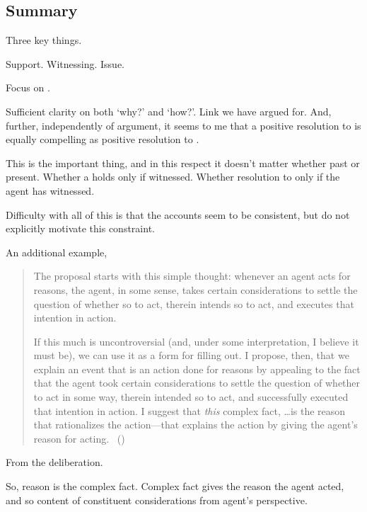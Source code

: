 \subsection{Summary}
\label{cha:clar:expand:issue:summary}

\begin{note}
  Three key things.

  Support.
  Witnessing.
  Issue.
\end{note}

\begin{note}
  Focus on \issueConstraint{}.
  \vspace{-\baselineskip}
  \begin{quote}
    \rIssueConstraint*
  \end{quote}
  Sufficient clarity on both `why?' and `how?'.
  Link we have argued for.
  And, further, independently of argument, it seems to me that a positive resolution to \issueConstraint{} is equally compelling as positive resolution to \issueInclusion{}.
\end{note}

\begin{note}
  This is the important thing, and in this respect it doesn't matter whether past or present.
  Whether a \support{} holds only if witnessed.
  Whether resolution to \qWhy{} only if the agent has witnessed.
\end{note}

\begin{note}
  Difficulty with all of this is that the accounts seem to be consistent, but do not explicitly motivate this constraint.
\end{note}

\begin{note}
  An additional example, \citeauthor{Hieronymi:2011aa}
  \begin{quote}
    The proposal starts with this simple thought: whenever an agent acts for reasons, the agent, in some sense, takes certain considerations to settle the question of whether so to act, therein intends so to act, and executes that intention in action.

    If this much is uncontroversial (and, under some interpretation, I believe it must be), we can use it as a form for filling out.
    I propose, then, that we explain an event that is an action done for reasons by appealing to the fact that the agent took certain considerations to settle the question of whether to act in some way, therein intended so to act, and successfully executed that intention in action.
    I suggest that \emph{this} complex fact, \dots is the reason that rationalizes the action---that explains the action by giving the agent’s reason for acting.%
    \mbox{ }\hfill\mbox{(\citeyear[431]{Hieronymi:2011aa})}
  \end{quote}

  From the deliberation.

  So, reason is the complex fact.
  Complex fact gives the reason the agent acted, and so content of constituent considerations from agent's perspective.
\end{note}

